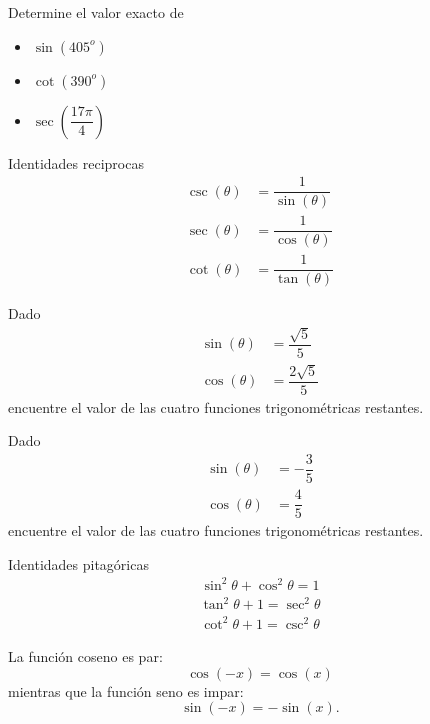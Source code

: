{}
	\begin{problema}
		Determine el valor exacto de 
		\begin{itemize}
			\item $\sin(405^{o})$
			\item $\cot(390^{o})$
			\item $\sec\left( \dfrac{17\pi}{4} \right)$
		\end{itemize}
		
	\end{problema}
	

{Identidades reciprocas}
	\begin{align*}
		\label{sull632}
		\csc(\theta)&= \dfrac{1}{\sin(\theta)}\\
		\sec(\theta)&= \dfrac{1}{\cos(\theta)}\\
		\cot(\theta)&= \dfrac{1}{\tan(\theta)}
	\end{align*}

{}
	\begin{problema}
		\label{exmp:6303}
		Dado 
		\begin{align*}
			\sin(\theta)&= \dfrac{\sqrt{5}}{5}\\
			\cos(\theta)&= \dfrac{2\sqrt{5}}{5}
		\end{align*}
		encuentre el valor de las cuatro funciones trigonométricas restantes.
	\end{problema}
	

{}
	\begin{problema}
		\label{exe:6335}
		Dado 
		\begin{align*}
			\sin(\theta)&= -\dfrac{3}{5}\\
			\cos(\theta)&= \dfrac{4}{5}
		\end{align*}
		encuentre el valor de las cuatro funciones trigonométricas restantes.
	\end{problema}
	

{Identidades pitagóricas}
	\begin{align*}
		\sin^{2}\theta+\cos^{2}\theta=1
	\end{align*} 
	\begin{align*}
		\tan^{2}\theta + 1 = \sec^{2}\theta
	\end{align*} 
	\begin{align*}
		\cot^{2}\theta + 1 =\csc^{2}\theta
	\end{align*}


	La función coseno es par:
	$$ \cos(-x)=\cos(x) $$
	mientras que la función seno es impar:
	$$ \sin(-x)=-\sin(x) .$$

